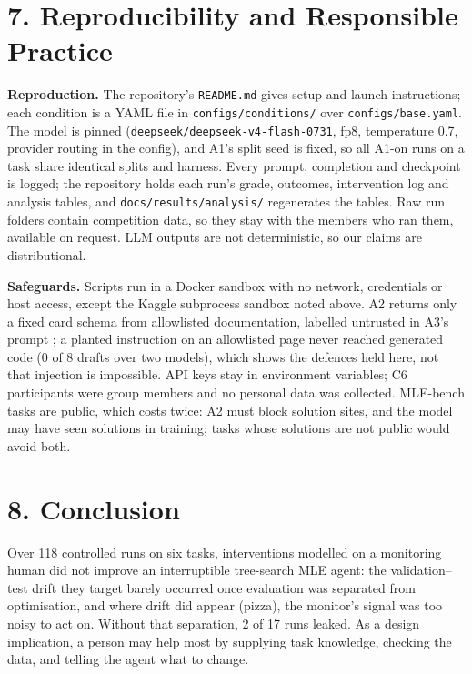 \documentclass[11pt]{article}
\begin{document}
\section*{7. Reproducibility and Responsible Practice}

\textbf{Reproduction.} The repository's \texttt{README.md} gives setup and launch
instructions; each condition is a YAML file in \texttt{configs/conditions/} over
\texttt{configs/base.yaml}. The model is pinned (\texttt{deepseek/deepseek-v4-flash-0731},
fp8, temperature 0.7, provider routing in the config), and A1's split seed is fixed, so
all A1-on runs on a task share identical splits and harness. Every prompt, completion and
checkpoint is logged; the repository holds each run's grade, outcomes, intervention log
and analysis tables, and \texttt{docs/results/analysis/} regenerates the tables. Raw run
folders contain competition data, so they stay with the members who ran them, available
on request. LLM outputs are not deterministic, so our claims are distributional.

\textbf{Safeguards.} Scripts run in a Docker sandbox with no network, credentials or
host access, except the Kaggle subprocess sandbox noted above. A2 returns only a fixed
card schema from allowlisted documentation, labelled untrusted in A3's prompt
\cite{insthier}; a planted instruction on an allowlisted page never reached generated code
(0 of 8 drafts over two models), which shows the defences held here, not that injection is
impossible. API keys stay in environment variables; C6 participants were group members
and no personal data was collected. MLE-bench tasks are public, which costs twice: A2 must
block solution sites, and the model may have seen solutions in training; tasks whose
solutions are not public would avoid both.

\section*{8. Conclusion}

Over 118 controlled runs on six tasks, interventions modelled on a monitoring human did
not improve an interruptible tree-search MLE agent: the validation--test drift they target
barely occurred once evaluation was separated from optimisation, and where drift did
appear (pizza), the monitor's signal was too noisy to act on.
Without that separation, 2 of 17 runs leaked. As a design implication, a person may help
most by supplying task knowledge, checking the data, and telling the agent what to change.
\end{document}
